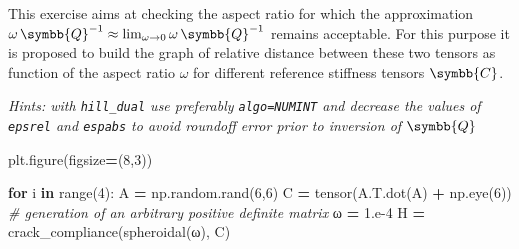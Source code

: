 \documentclass[
  a4paper,
  numbers=noendperiod,
  DIV=12]{scrreprt}
\newenvironment{Shaded}{\begin{snugshade}}{\end{snugshade}}
\newcommand{\BuiltInTok}[1]{#1}
\newcommand{\CommentTok}[1]{\textcolor[rgb]{0.56,0.35,0.01}{\textit{#1}}}
\newcommand{\ControlFlowTok}[1]{\textcolor[rgb]{0.13,0.29,0.53}{\textbf{#1}}}
\newcommand{\DecValTok}[1]{\textcolor[rgb]{0.00,0.00,0.81}{#1}}
\newcommand{\FloatTok}[1]{\textcolor[rgb]{0.00,0.00,0.81}{#1}}
\newcommand{\KeywordTok}[1]{\textcolor[rgb]{0.13,0.29,0.53}{\textbf{#1}}}
\newcommand{\NormalTok}[1]{#1}
\newcommand{\OperatorTok}[1]{\textcolor[rgb]{0.81,0.36,0.00}{\textbf{#1}}}
\newcommand{\uuuu}[1]{{\symbb{{#1}}}}
\begin{document}
\begin{tcolorbox}[enhanced jigsaw, arc=.35mm, bottomrule=.15mm, bottomtitle=1mm, breakable, colback=white, colbacktitle=quarto-callout-caution-color!10!white, colframe=quarto-callout-caution-color-frame, coltitle=black, left=2mm, leftrule=.75mm, opacityback=0, opacitybacktitle=0.6, rightrule=.15mm, title={Exercise}, titlerule=0mm, toprule=.15mm, toptitle=1mm]

This exercise aims at checking the aspect ratio for which the
approximation
\(\omega\,\uuuu{Q}^{-1}\approx \lim_{\omega\to 0}\omega\,\uuuu{Q}^{-1}\)
remains acceptable. For this purpose it is proposed to build the graph
of relative distance between these two tensors as function of the aspect
ratio \(\omega\) for different reference stiffness tensors \(\uuuu{C}\).

\emph{Hints: with \texttt{hill\_dual} use preferably
\texttt{algo=NUMINT} and decrease the values of \texttt{epsrel} and
\texttt{espabs} to avoid roundoff error prior to inversion of
\(\uuuu{Q}\)}

\begin{Shaded}
\begin{Highlighting}[]
\NormalTok{plt.figure(figsize}\OperatorTok{=}\NormalTok{(}\DecValTok{8}\NormalTok{,}\DecValTok{3}\NormalTok{))}

\ControlFlowTok{for}\NormalTok{ i }\KeywordTok{in} \BuiltInTok{range}\NormalTok{(}\DecValTok{4}\NormalTok{):}
\NormalTok{    A }\OperatorTok{=}\NormalTok{ np.random.rand(}\DecValTok{6}\NormalTok{,}\DecValTok{6}\NormalTok{)}
\NormalTok{    C }\OperatorTok{=}\NormalTok{ tensor(A.T.dot(A) }\OperatorTok{+}\NormalTok{ np.eye(}\DecValTok{6}\NormalTok{)) }\CommentTok{\# generation of an arbitrary positive definite matrix}
\NormalTok{    ω }\OperatorTok{=} \FloatTok{1.e{-}4}
\NormalTok{    H }\OperatorTok{=}\NormalTok{ crack\_compliance(spheroidal(ω), C)}


\end{Highlighting}
\end{Shaded}
\end{tcolorbox}
\end{document}
